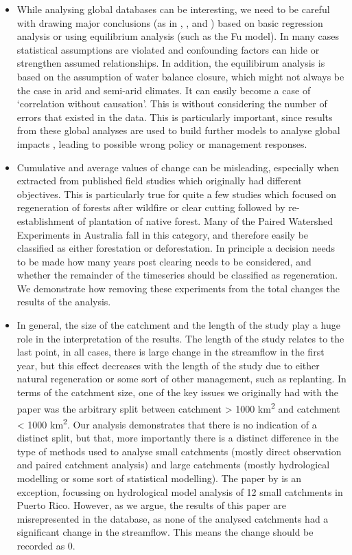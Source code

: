 \documentclass[]{elsarticle} %
\providecommand{\tightlist}{%
  \setlength{\itemsep}{0pt}\setlength{\parskip}{0pt}}
\begin{document}
\begin{itemize}
\tightlist
\item
  While analysing global databases can be interesting, we need to be careful with drawing major conclusions (as in \citet{zhang2017}, \citet{filoso2017}, \citet{zhou2015} and \citet{jackson2005}) based on basic regression analysis or using equilibrium analysis (such as the Fu model). In many cases statistical assumptions are violated and confounding factors can hide or strengthen assumed relationships. In addition, the equilibirum analysis is based on the assumption of water balance closure, which might not always be the case in arid and semi-arid climates. It can easily become a case of `correlation without causation'. This is without considering the number of errors that existed in the data. This is particularly important, since results from these global analyses are used to build further models to analyse global impacts \citep[e.g.][]{hoekvandijke2022}, leading to possible wrong policy or management responses.\\
\item
  Cumulative and average values of change can be misleading, especially when extracted from published field studies which originally had different objectives. This is particularly true for quite a few studies which focused on regeneration of forests after wildfire or clear cutting followed by re-establishment of plantation of native forest. Many of the Paired Watershed Experiments in Australia \citep[e.g.][]{cornish2001, webb2009, webb2012, webb2013, watson2001} fall in this category, and therefore easily be classified as either forestation or deforestation. In principle a decision needs to be made how many years post clearing needs to be considered, and whether the remainder of the timeseries should be classified as regeneration. We demonstrate how removing these experiments from the total changes the results of the analysis.
\item
  In general, the size of the catchment and the length of the study play a huge role in the interpretation of the results. The length of the study relates to the last point, in all cases, there is large change in the streamflow in the first year, but this effect decreases with the length of the study due to either natural regeneration or some sort of other management, such as replanting. In terms of the catchment size, one of the key issues we originally had with the \citet{zhang2017} paper was the arbitrary split between catchment \textgreater{} 1000 km\textsuperscript{2} and catchment \textless{} 1000 km\textsuperscript{2}. Our analysis demonstrates that there is no indication of a distinct split, but that, more importantly there is a distinct difference in the type of methods used to analyse small catchments (mostly direct observation and paired catchment analysis) and large catchments (mostly hydrological modelling or some sort of statistical modelling). The paper by \citet{beck2013} is an exception, focussing on hydrological model analysis of 12 small catchments in Puerto Rico. However, as we argue, the results of this paper are misrepresented in the database, as none of the analysed catchments had a significant change in the streamflow. This means the change should be recorded as 0.

\end{itemize}
\end{document}
